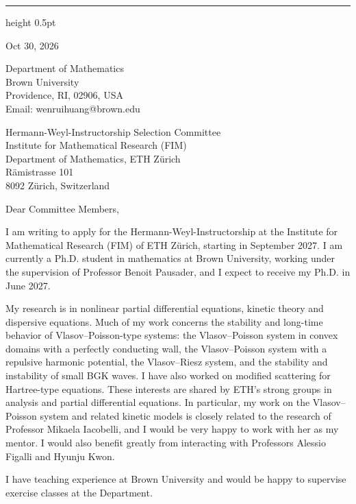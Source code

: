 \documentclass[10pt]{article}
\begin{document}
\vspace{0.08in}
\hrule height 0.5pt

\vspace{0.47in}
\hfill
\begin{minipage}{2.27in}
Oct 30, 2026

\vspace{0.16in}
Department of Mathematics\\
Brown University\\
Providence, RI, 02906, USA\\
Email: wenrui\textunderscore huang@brown.edu
\end{minipage}

\vspace{0.30in}
Hermann-Weyl-Instructorship Selection Committee\\
Institute for Mathematical Research (FIM)\\
Department of Mathematics, ETH Z\"urich\\
R\"amistrasse 101\\
8092 Z\"urich, Switzerland
 
\vspace{0.16in}
Dear Committee Members,
 
I am writing to apply for the Hermann-Weyl-Instructorship at the Institute for Mathematical Research (FIM) of ETH Z\"urich, starting in September 2027. I am currently a Ph.D. student in mathematics at Brown University, working under the supervision of Professor Benoit Pausader, and I expect to receive my Ph.D. in June 2027.
 
My research is in nonlinear partial differential equations, kinetic theory and dispersive equations. Much of my work concerns the stability and long-time behavior of Vlasov--Poisson-type systems: the Vlasov--Poisson system in convex domains with a perfectly conducting wall, the Vlasov--Poisson system with a repulsive harmonic potential, the Vlasov--Riesz system, and the stability and instability of small BGK waves. I have also worked on modified scattering for Hartree-type equations. These interests are shared by ETH's strong groups in analysis and partial differential equations. In particular, my work on the Vlasov--Poisson system and related kinetic models is closely related to the research of Professor Mikaela Iacobelli, and I would be very happy to work with her as my mentor. I would also benefit greatly from interacting with Professors Alessio Figalli and Hyunju Kwon.
 
I have teaching experience at Brown University and would be happy to supervise exercise classes at the Department.
 
\end{document}
